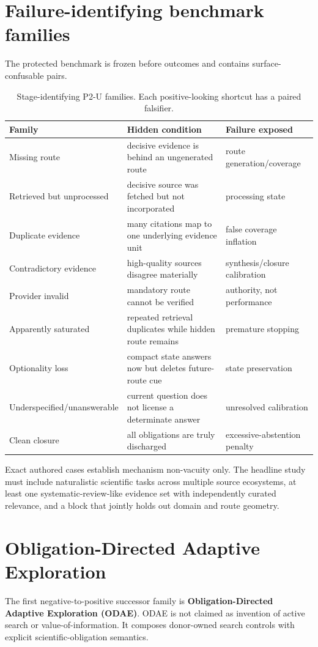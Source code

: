 \documentclass[11pt]{article}
\begin{document}
\section{Failure-identifying benchmark families}
The protected benchmark is frozen before outcomes and contains surface-confusable pairs.
\begin{table}[h]
\centering
\small
\begin{tabularx}{\textwidth}{@{}lXX@{}}
\toprule
Family & Hidden condition & Failure exposed \\
\midrule
Missing route & decisive evidence is behind an ungenerated route & route generation/coverage \\
Retrieved but unprocessed & decisive source was fetched but not incorporated & processing state \\
Duplicate evidence & many citations map to one underlying evidence unit & false coverage inflation \\
Contradictory evidence & high-quality sources disagree materially & synthesis/closure calibration \\
Provider invalid & mandatory route cannot be verified & authority, not performance \\
Apparently saturated & repeated retrieval duplicates while hidden route remains & premature stopping \\
Optionality loss & compact state answers now but deletes future-route cue & state preservation \\
Underspecified/unanswerable & current question does not license a determinate answer & unresolved calibration \\
Clean closure & all obligations are truly discharged & excessive-abstention penalty \\
\bottomrule
\end{tabularx}
\caption{Stage-identifying P2-U families. Each positive-looking shortcut has a paired falsifier.}
\end{table}

Exact authored cases establish mechanism non-vacuity only. The headline study must include naturalistic scientific tasks across multiple source ecosystems, at least one systematic-review-like evidence set with independently curated relevance, and a block that jointly holds out domain and route geometry.

\section{Obligation-Directed Adaptive Exploration}
The first negative-to-positive successor family is \textbf{Obligation-Directed Adaptive Exploration (ODAE)}. ODAE is not claimed as invention of active search or value-of-information. It composes donor-owned search controls with explicit scientific-obligation semantics.
\end{document}

